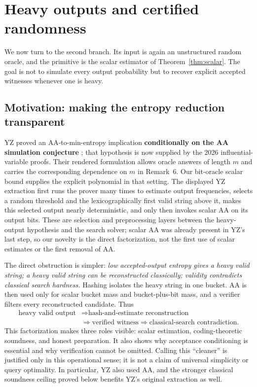 \documentclass[11pt]{article}
\theoremstyle{definition}\newtheorem{definition}[theorem]{Definition}
\theoremstyle{remark}\newtheorem{remark}[theorem]{Remark}
\begin{document}
\section{Heavy outputs and certified randomness}\label{sec:certified}
We now turn to the second branch. Its input is again an unstructured random oracle, and the primitive is the scalar estimator of Theorem~\ref{thm:scalar}. The goal is not to simulate every output probability but to recover explicit accepted witnesses whenever one is heavy.

\subsection{Motivation: making the entropy reduction transparent}
YZ proved an AA-to-min-entropy implication \textbf{conditionally on the AA simulation conjecture} \cite[Conjecture~8.1 and Theorem~8.4]{YZ24}; that hypothesis is now supplied by the 2026 influential-variable proofs. Their rendered formulation allows oracle answers of length \(m\) and carries the corresponding dependence on \(m\) in Remark~6. Our bit-oracle scalar bound supplies the explicit polynomial in that setting. The displayed YZ extraction first runs the prover many times to estimate output frequencies, selects a random threshold and the lexicographically first valid string above it, makes this selected output nearly deterministic, and only then invokes scalar AA on its output bits. These are selection and preprocessing layers between the heavy-output hypothesis and the search solver; scalar AA was already present in YZ's last step, so our novelty is the direct factorization, not the first use of scalar estimates or the first removal of AA.

The direct obstruction is simpler: \emph{low accepted-output entropy gives a heavy valid string; a heavy valid string can be reconstructed classically; validity contradicts classical search hardness.} Hashing isolates the heavy string in one bucket. AA is then used only for scalar bucket mass and bucket-plus-bit mass, and a verifier filters every reconstructed candidate. Thus
\begin{align*}
 \text{heavy valid output}&\Longrightarrow\text{hash-and-estimate reconstruction}\\
 &\Longrightarrow\text{verified witness}\Longrightarrow\text{classical-search contradiction.}
\end{align*}
This factorization makes three roles visible: scalar estimation, coding-theoretic soundness, and honest preparation. It also shows why acceptance conditioning is essential and why verification cannot be omitted. Calling this ``cleaner'' is justified only in this operational sense; it is not a claim of universal simplicity or query optimality. In particular, YZ also used AA, and the stronger classical soundness ceiling proved below benefits YZ's original extraction as well.
\end{document}
